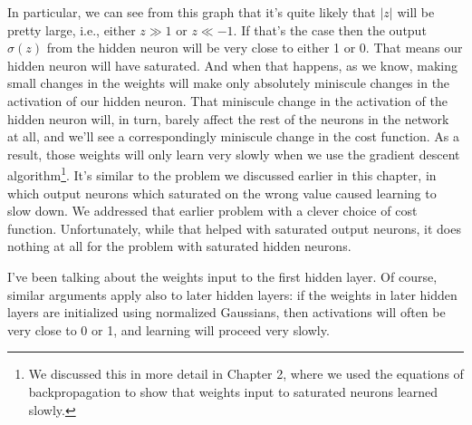 \documentclass[a4paper,twoside,10pt]{book}
\begin{document}
In particular, we can see from this graph that it's quite likely that $|z|$ will be pretty large, i.e., either $z\gg1$ or $z\ll-1$. If that's the case then the output $\sigma(z)$ from the hidden neuron will be very close to either 1 or 0. That means our hidden neuron will have saturated. And when that happens, as we know, making small changes in the weights will make only absolutely miniscule changes in the activation of our hidden neuron. That miniscule change in the activation of the hidden neuron will, in turn, barely affect the rest of the neurons in the network at all, and we'll see a correspondingly miniscule change in the cost function. As a result, those weights will only learn very slowly when we use the gradient descent algorithm\footnote{We discussed this in more detail in Chapter 2, where we used the equations of backpropagation to show that weights input to saturated neurons learned slowly.}. It's similar to the problem we discussed earlier in this chapter, in which output neurons which saturated on the wrong value caused learning to slow down. We addressed that earlier problem with a clever choice of cost function. Unfortunately, while that helped with saturated output neurons, it does nothing at all for the problem with saturated hidden neurons.

I've been talking about the weights input to the first hidden layer. Of course, similar arguments apply also to later hidden layers: if the weights in later hidden layers are initialized using normalized Gaussians, then activations will often be very close to 0 or 1, and learning will proceed very slowly.
\end{document}
